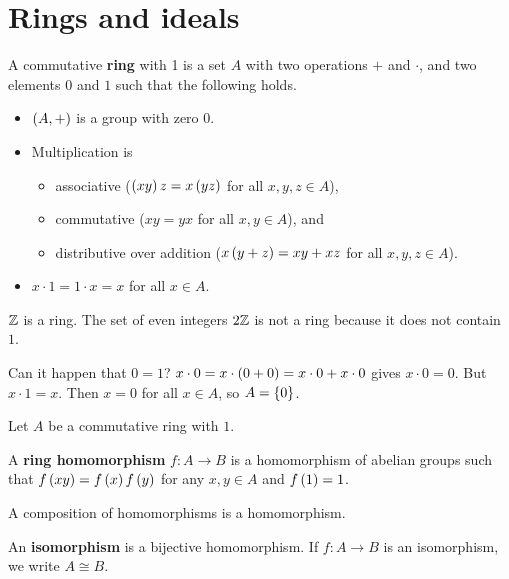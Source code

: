 \section{Rings and ideals}

\begin{definition}
A commutative \textbf{ring} with 1 is a set $ A $ with two operations $ + $ and $ \cdot $, and two elements $ 0 $ and $ 1 $ such that the following holds.
\begin{itemize}
\item $ \br{A, +} $ is a group with zero $ 0 $.
\item Multiplication is
\begin{itemize}
\item associative ($ \br{xy}z = x\br{yz} $ for all $ x, y, z \in A $),
\item commutative ($ xy = yx $ for all $ x, y \in A $), and
\item distributive over addition ($ x\br{y + z} = xy + xz $ for all $ x, y, z \in A $).
\end{itemize}
\item $ x \cdot 1 = 1 \cdot x = x $ for all $ x \in A $.
\end{itemize}
\end{definition}

\begin{example*}
$ \mathbb{Z} $ is a ring. The set of even integers $ 2\mathbb{Z} $ is not a ring because it does not contain $ 1 $.
\end{example*}

\begin{remark}
Can it happen that $ 0 = 1 $? $ x \cdot 0 = x \cdot \br{0 + 0} = x \cdot 0 + x \cdot 0 $ gives $ x \cdot 0 = 0 $. But $ x \cdot 1 = x $. Then $ x = 0 $ for all $ x \in A $, so $ A = \cbr{0} $.
\end{remark}

Let $ A $ be a commutative ring with $ 1 $.

\begin{definition}
A \textbf{ring homomorphism} $ f : A \to B $ is a homomorphism of abelian groups such that $ f\br{xy} = f\br{x}f\br{y} $ for any $ x, y \in A $ and $ f\br{1} = 1 $.
\end{definition}

\begin{proposition}
A composition of homomorphisms is a homomorphism.
\end{proposition}

An \textbf{isomorphism} is a bijective homomorphism. If $ f : A \to B $ is an isomorphism, we write $ A \cong B $.


